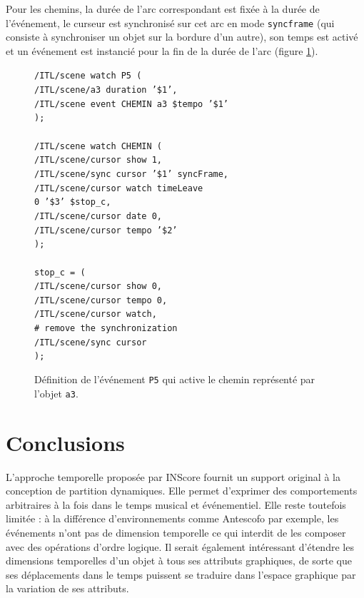 \documentclass{article}
\newcommand{\OSC}[1]	{{\fontsize{9pt}{9pt} \selectfont\texttt{#1}}}
\newcommand{\tab}{\hspace*{4mm}}
\newcommand{\sample}[1]		{\vspace{-0.2em}\begin{center}\colorbox{mygrey}{\begin{minipage}[t]{0.98\columnwidth} {\small \texttt{#1}}\end{minipage}}\end{center}}
\begin{document}
Pour les chemins, la durée de l'arc correspondant est fixée à la durée de l'événement, le curseur est synchronisé sur cet arc en mode \OSC{syncframe} (qui consiste à synchroniser un objet sur la bordure d'un autre), son temps est activé et un événement est instancié pour la fin de la durée de l'arc (figure \ref{fig:chemin}).
\begin{figure}[h]
   \centering
\sample{/ITL/scene watch P5 ( \\
\tab/ITL/scene/a3 duration '\$1', \\
\tab/ITL/scene event CHEMIN a3 \$tempo '\$1' \\
); \\
\\
/ITL/scene watch CHEMIN ( \\
\tab/ITL/scene/cursor show 1,\\
\tab/ITL/scene/sync cursor '\$1' syncFrame,\\
\tab/ITL/scene/cursor watch timeLeave \\
\hspace*{30mm}0 '\$3' \$stop\_c,\\
\tab/ITL/scene/cursor date 0,\\
\tab/ITL/scene/cursor tempo '\$2'\\
); \\
\\
stop\_c = ( \\
\tab/ITL/scene/cursor show 0,\\
\tab/ITL/scene/cursor tempo 0, \\
\tab/ITL/scene/cursor watch,  \\
\tab\# remove the synchronization \\
\tab/ITL/scene/sync cursor \\
);
}
   \caption{Définition de l'événement \OSC{P5} qui active le chemin représenté par l'objet \OSC{a3}.}
   \label{fig:chemin}
\end{figure}



\section{Conclusions}
L'approche temporelle proposée par INScore fournit un support original à la conception de partition dynamiques. Elle permet d'exprimer des comportements arbitraires à la fois dans le temps musical et événementiel.  
Elle reste toutefois limitée : à la différence d'environnements comme Antescofo par exemple, les événements n'ont pas de dimension temporelle ce qui interdit de les composer avec des opérations d'ordre logique. Il serait également intéressant d'étendre les dimensions temporelles d'un objet à tous ses attributs graphiques, de sorte que ses déplacements dans le temps puissent se traduire dans l'espace graphique par la variation de ses attributs.
\end{document}
